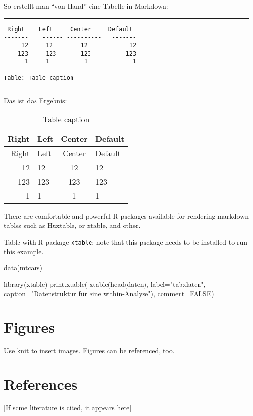 \documentclass[11pt,a4paper,oneside]{article}
\newenvironment{Shaded}{\begin{snugshade}}{\end{snugshade}}
\newcommand{\AttributeTok}[1]{\textcolor[rgb]{0.77,0.63,0.00}{#1}}
\newcommand{\ConstantTok}[1]{\textcolor[rgb]{0.00,0.00,0.00}{#1}}
\newcommand{\FunctionTok}[1]{\textcolor[rgb]{0.00,0.00,0.00}{#1}}
\newcommand{\NormalTok}[1]{#1}
\newcommand{\StringTok}[1]{\textcolor[rgb]{0.31,0.60,0.02}{#1}}
\begin{document}
So erstellt man \enquote{von Hand} eine Tabelle in Markdown:

\begin{center}\rule{0.5\linewidth}{0.5pt}\end{center}

\begin{verbatim}
 Right    Left     Center     Default
-------    ------ ----------   -------
     12     12        12            12
    123     123       123          123
      1     1          1             1
      
Table: Table caption
\end{verbatim}

\begin{center}\rule{0.5\linewidth}{0.5pt}\end{center}

Das ist das Ergebnis:

\begin{longtable}[]{@{}rlcl@{}}
\caption{Table caption}\tabularnewline
\toprule
Right & Left & Center & Default\tabularnewline
\midrule
\endfirsthead
\toprule
Right & Left & Center & Default\tabularnewline
\midrule
\endhead
12 & 12 & 12 & 12\tabularnewline
123 & 123 & 123 & 123\tabularnewline
1 & 1 & 1 & 1\tabularnewline
\bottomrule
\end{longtable}

There are comfortable and powerful R packages available for rendering
markdown tables such as Huxtable, or xtable, and other.

Table with R package \texttt{xtable}; note that this package needs to be
installed to run this example.

\begin{Shaded}
\begin{Highlighting}[]
\FunctionTok{data}\NormalTok{(mtcars)}

\FunctionTok{library}\NormalTok{(xtable)}
\FunctionTok{print.xtable}\NormalTok{(}
  \FunctionTok{xtable}\NormalTok{(}\FunctionTok{head}\NormalTok{(daten), }
         \AttributeTok{label=}\StringTok{"tab:daten"}\NormalTok{, }
         \AttributeTok{caption=}\StringTok{"Datenstruktur für eine within{-}Analyse"}\NormalTok{), }
  \AttributeTok{comment=}\ConstantTok{FALSE}\NormalTok{)}
\end{Highlighting}
\end{Shaded}

\hypertarget{figures}{%
\section{Figures}\label{figures}}

Use knit to insert images. Figures can be referenced, too.

\hypertarget{references}{%
\section{References}\label{references}}

{[}If some literature is cited, it appears here{]}

\setlength{\parindent}{-0.5in}
\setlength{\leftskip}{0.5in}

\newpage
\printbibliography
\end{document}
